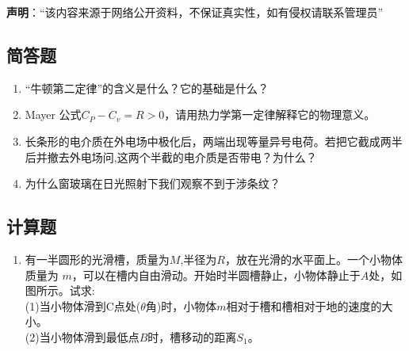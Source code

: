 

\textbf{声明}：“该内容来源于网络公开资料，不保证真实性，如有侵权请联系管理员”
\subsection{简答题}
\begin{enumerate}
\item “牛顿第二定律”的含义是什么？它的基础是什么？
\item  Mayer 公式$C_P-C_v=R>0$，请用热力学第一定律解释它的物理意义。
\item 长条形的电介质在外电场中极化后，两端出现等量异号电荷。若把它截成两半后并撤去外电场问,这两个半截的电介质是否带电？为什么？
\item 为什么窗玻璃在日光照射下我们观察不到于涉条纹？
\end{enumerate}
\subsection{计算题}
\begin{enumerate}
\item 有一半圆形的光滑槽，质量为$ M$,半径为$R$，放在光滑的水平面上。一个小物体质量为 $m$，可以在槽内自由滑动。开始时半圆槽静止，小物体静止于$A$处，如图所示。试求:\\
(1)当小物体滑到C点处($\theta$角)时，小物体$m$相对于槽和槽相对于地的速度的大小。\\
(2)当小物体滑到最低点$B$时，槽移动的距离$S_1$。
\end{enumerate}
